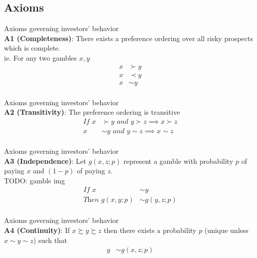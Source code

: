 \documentclass[
14pt,notheorems,hyperref={pdfauthor=whatever}
]{beamer}
\begin{document}
\subsection{Axioms}

\begin{frame}
Axioms governing investors' behavior\\
\hfill \break
\textbf{A1 (Completeness)}: There exists a preference ordering over all risky prospects which is complete.\\
\hfill \break
ie. For any two gambles $x,y$
\hfill \break
\begin{align*}
    x &\succ y\\
    x &\prec y\\
    x &\sim y\\
\end{align*}
\end{frame}

\begin{frame}
Axioms governing investors' behavior\\
\hfill \break
\textbf{A2 (Transitivity)}: The preference ordering is transitive\\
\hfill \break
\begin{align*}
    \textit{If }x &\succ y \textit{ and } y \succ z \implies x \succ z\\
    x &\sim y \textit{ and } y \sim z \implies x \sim z\\
\end{align*}
\end{frame}

\begin{frame}
Axioms governing investors' behavior\\
\hfill \break
\textbf{A3 (Independence)}: Let $g(x,z;p)$ represent a gamble with probability $p$ of paying $x$ and $(1-p)$ of paying $z$.\\
TODO: gamble img\\
\hfill \break
\begin{align*}
    \textit{If }x &\sim y\\
    \textit{Then }g(x,y;p) &\sim g(y,z;p)\\
\end{align*}
\end{frame}

\begin{frame}
Axioms governing investors' behavior\\
\hfill \break
\textbf{A4 (Continuity)}: If $x \succsim y \succsim z$ then there exists a probability $p$ (unique unless $x \sim y \sim z$) such that\\
\hfill \break
\begin{align*}
    y &\sim g(x,z;p)\\
\end{align*}
\end{frame}
\end{document}
